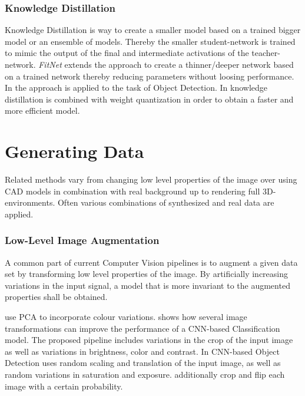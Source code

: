 \subsubsection{Knowledge Distillation}

Knowledge Distillation \cite{Hinton2006} is way to create a smaller model based on a trained bigger model or an ensemble of models. Thereby the smaller student-network is trained to mimic the output of the final and intermediate activations of the teacher-network. \textit{FitNet} extends the approach to create a thinner/deeper network based on a trained network thereby reducing parameters without loosing performance. In \cite{Li2017c} the approach is applied to the task of Object Detection. In \cite{Wei2018a} knowledge distillation is combined with weight quantization in order to obtain a faster and more efficient model.



\section{Generating Data}
\label{sec:training:related}

Related methods vary from changing low level properties of the image over using CAD models in combination with real background up to rendering full 3D-environments. Often various combinations of synthesized and real data are applied. 

\subsubsection{Low-Level Image Augmentation}

A common part of current Computer Vision pipelines is to augment a given data set by transforming low level properties of the image. By artificially increasing variations in the input signal, a model that is more invariant to the augmented properties shall be obtained.

\citeauthor{Krizhevsky2012a} \cite{Krizhevsky2012a} use \ac{PCA} to incorporate colour variations. \citeauthor{Howard2013} \cite{Howard2013} shows how several image transformations can improve the performance of a \ac{CNN}-based Classification model. The proposed pipeline includes variations in the crop of the input image as well as variations in brightness, color and contrast. In \ac{CNN}-based Object Detection \citeauthor{Redmon} \cite{Redmon} uses random scaling and translation of the input image, as well as random variations in saturation and exposure. \citeauthor{Liu} \cite{Liu} additionally crop and flip each image with a certain probability.

